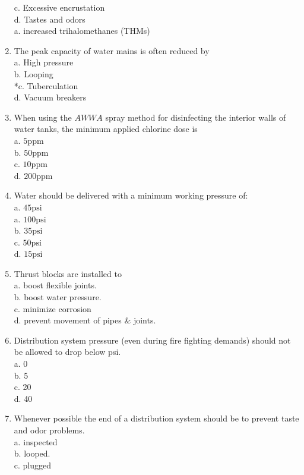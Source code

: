 \begin{enumerate}[1.]
c. Excessive encrustation\\
d. Tastes and odors\\
a. increased trihalomethanes (THMs)\\
\item The peak capacity of water mains is often reduced by\\
a. High pressure\\
b. Looping\\
*c. Tuberculation\\
d. Vacuum breakers\\
\item When using the $A W W A$ spray method for disinfecting the interior walls of water tanks, the minimum applied chlorine dose is\\
a. $5 \mathrm{ppm}$\\
b. $50 \mathrm{ppm}$\\
c. $10 \mathrm{ppm}$\\
d. $200 \mathrm{ppm}$\\
\item Water should be delivered with a minimum working pressure of:\\
a. $45 \mathrm{psi}$\\
a. $100 \mathrm{psi}$\\
b. $35 \mathrm{psi}$\\
c. $50 \mathrm{psi}$\\
d. $15 \mathrm{psi}$
\item Thrust blocks are installed to\\
a. boost flexible joints.\\
b. boost water pressure.\\
c. minimize corrosion\\
d. prevent movement of pipes \& joints.\\
\item Distribution system pressure (even during fire fighting demands) should not be allowed to drop below psi.\\
a. 0\\
b. 5\\
c. 20\\
d. 40\\
\item Whenever possible the end of a distribution system should be to prevent taste and odor problems.\\
a. inspected\\
b. looped.\\
c. plugged\\

\end{enumerate}
